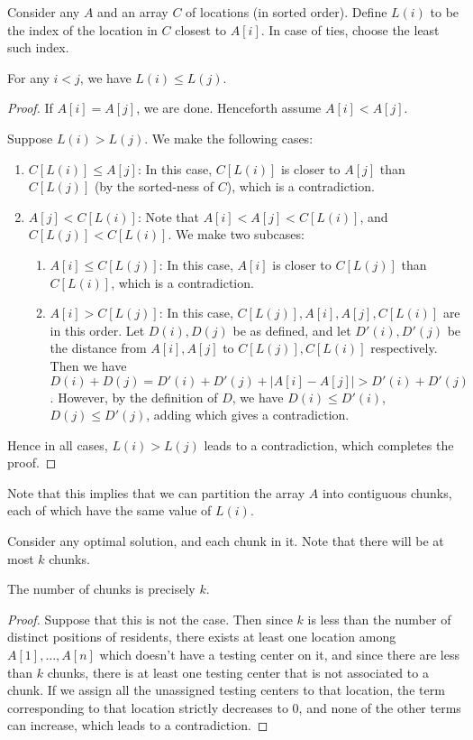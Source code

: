 Consider any $A$ and an array $C$ of locations (in sorted order). Define $L(i)$ to be the index of the location in $C$ closest to $A[i]$. In case of ties, choose the least such index.\\

\begin{claim}
For any $i < j$, we have $L(i) \le L(j)$.
\end{claim}
\begin{proof}
If $A[i] = A[j]$, we are done. Henceforth assume $A[i] < A[j]$. 

Suppose $L(i) > L(j)$. We make the following cases:

\begin{enumerate}
\item $C[L(i)] \le A[j]$: In this case, $C[L(i)]$ is closer to $A[j]$ than $C[L(j)]$ (by the sorted-ness of $C$), which is a contradiction.
\item $A[j] < C[L(i)]$: Note that $A[i] < A[j] < C[L(i)]$, and $C[L(j)] < C[L(i)]$.
    We make two subcases:
        \begin{enumerate}
            \item $A[i] \le C[L(j)]$: In this case, $A[i]$ is closer to $C[L(j)]$ than $C[L(i)]$, which is a contradiction.
            \item $A[i] > C[L(j)]$: In this case, $C[L(j)], A[i], A[j], C[L(i)]$ are in this order. Let $D(i), D(j)$ be as defined, and let $D'(i), D'(j)$ be the distance from $A[i], A[j]$ to
                $C[L(j)], C[L(i)]$ respectively. Then we have $D(i) + D(j) = D'(i) + D'(j) + |A[i] - A[j]| > D'(i) + D'(j)$. However, by the definition of $D$, we have $D(i) \le D'(i)$, $D(j) \le D'(j)$, adding which gives a contradiction.
        \end{enumerate}
\end{enumerate}
    Hence in all cases, $L(i) > L(j)$ leads to a contradiction, which completes the proof.
\end{proof}

Note that this implies that we can partition the array $A$ into contiguous chunks, each of which have the same value of $L(i)$.

Consider any optimal solution, and each chunk in it. Note that there will be at most $k$ chunks.

\begin{claim}
The number of chunks is precisely $k$.
\end{claim}
\begin{proof}
    Suppose that this is not the case. Then since $k$ is less than the number of distinct positions of residents, there exists at least one location among $A[1], \ldots, A[n]$ which doesn't have a
    testing center on it, and since there are less than $k$ chunks, there is at least one testing center that is not associated to a chunk. If we assign all the unassigned testing centers to that location, the term corresponding to that location
    strictly decreases to 0, and none of the other terms can increase, which leads to a contradiction.
\end{proof}


